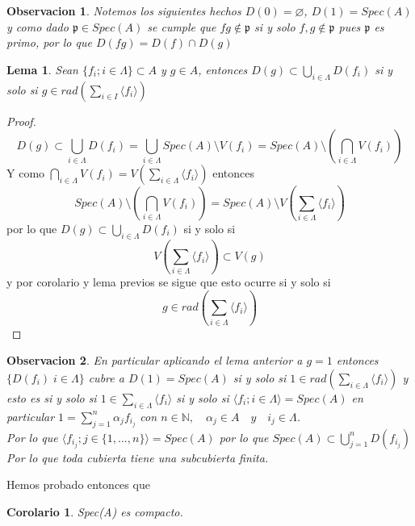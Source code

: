 \documentclass{article}
\newtheorem{corolario}{Corolario}
\newtheorem{lema}{Lema}
\newtheorem{observacion}{Observacion}
\begin{document}
\begin{observacion}
    Notemos los siguientes hechos $D(0)=\varnothing$,
    $D(1)=Spec(A)$ y como dado $\mathfrak{p} \in Spec(A)$ se cumple
    que $fg \notin \mathfrak{p}$ si y solo $f,g \notin \mathfrak{p}$
    pues $\mathfrak{p}$ es primo, por lo que $D(fg)= D(f)\cap D(g)$
\end{observacion}

\begin{lema}
    Sean $\{f_i; i\in \Lambda\} \subset A$ y $g \in A$,
    entonces $D(g)\subset \bigcup_{i\in \Lambda}D(f_i) $ si y solo si
    $g \in rad(\sum_{i\in I} \langle f_i \rangle)$
\end{lema}

\begin{proof}
    $$D(g) \subset \bigcup_{i\in \Lambda}D(f_i) = \bigcup_{i\in  \Lambda} Spec(A)\setminus V(f_i)
    = Spec(A)\setminus (\bigcap_{i\in  \Lambda}V(f_i)) $$
    Y como $\bigcap_{i\in  \Lambda}V(f_i) = V(\sum_{i\in \Lambda}\langle f_i \rangle)$
    entonces $$Spec(A)\setminus (\bigcap_{i\in  \Lambda}V(f_i)) = Spec(A)\setminus V(\sum_{i\in \Lambda}\langle f_i \rangle)$$
    por lo que $D(g)\subset \bigcup_{i \in \Lambda}D(f_i)$ si y solo si
    $$V(\sum_{i\in \Lambda}\langle f_i \rangle) \subset V(g)$$
    y por corolario y lema previos se sigue que esto ocurre si y solo si
    $$g \in rad(\sum_{i\in \Lambda}\langle f_i \rangle)$$
\end{proof}

\begin{observacion}
    En particular aplicando el lema anterior a 
    $g = 1$ entonces $\{D(f_i)\; i\in \Lambda\}$ 
    cubre a $D(1) = Spec(A)$ si y solo si $1 \in rad(\sum_{i\in \Lambda} \langle f_i \rangle)$
    y esto es si y solo si $1\in \sum_{i\in \Lambda} \langle f_i \rangle$
    si y solo si $\langle f_i; i\in \Lambda \rangle = Spec(A)$
    en particular $1 = \sum_{j=1}^{n} \alpha_j f_{i_j}$ con $n\in \mathbb{N}, \quad \alpha_j \in A \quad y \quad i_j \in \Lambda$.\\
    Por lo que $\langle f_{i_j}; j\in\{1,...,n \} \rangle = Spec(A)$
    por lo que $Spec(A) \subset \bigcup_{j=1}^{n}D(f_{i_j})$
    Por lo que toda cubierta tiene una subcubierta finita.
\end{observacion}

Hemos probado entonces que 

\begin{corolario}
    Spec(A) es compacto.
\end{corolario}
\end{document}
